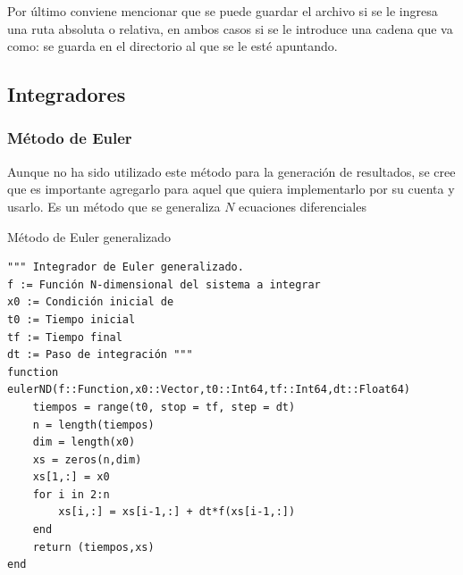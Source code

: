 \setlength{\parindent}{0cm} Por último conviene mencionar que se puede guardar el archivo si se le ingresa una ruta absoluta o relativa, en ambos casos si se le introduce una cadena que va como:  se guarda en el directorio al que se le esté apuntando. 

\newpage
\subsection{Integradores}\label{sec:integradores}



\subsubsection{Método de Euler}

Aunque no ha sido utilizado este método para la generación de resultados, se cree que es importante agregarlo para aquel que quiera implementarlo por su cuenta y usarlo. Es un método que se generaliza $N$ ecuaciones diferenciales
\begin{algorithm}
	\caption{Método de Euler generalizado}
	\label{al:Euler}
	\begin{verbatim}
""" Integrador de Euler generalizado.
f := Función N-dimensional del sistema a integrar
x0 := Condición inicial de
t0 := Tiempo inicial
tf := Tiempo final
dt := Paso de integración """
function eulerND(f::Function,x0::Vector,t0::Int64,tf::Int64,dt::Float64)          
	tiempos = range(t0, stop = tf, step = dt)
	n = length(tiempos)                      
	dim = length(x0)                         
	xs = zeros(n,dim)                        
	xs[1,:] = x0                             
	for i in 2:n 
		xs[i,:] = xs[i-1,:] + dt*f(xs[i-1,:])
	end
	return (tiempos,xs)
end
	\end{verbatim}
\end{algorithm}

